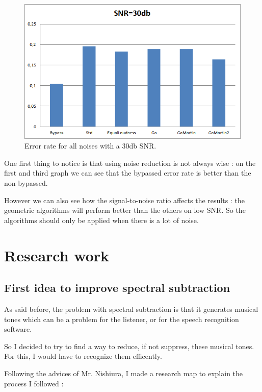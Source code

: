 \begin{figure}[H]
\begin{center}
\includegraphics[scale=0.7]{images/snr30.png}
\caption{Error rate for all noises with a 30db SNR.}
\end{center}
\end{figure}

One first thing to notice is that using noise reduction is not always wise : on the first and third graph we can see that the bypassed error rate is better than the non-bypassed. 

However we can also see how the signal-to-noise ratio affects the results : the geometric algorithms will perform better than the others on low SNR. So the algorithms should only be applied when there is a lot of noise.
\section{Research work}
\subsection{First idea to improve spectral subtraction}
As said before, the problem with spectral subtraction is that it generates musical tones which can be a problem for the listener, or for the speech recognition software.

So I decided to try to find a way to reduce, if not suppress, these musical tones.
For this, I would have to recognize them efficently.

Following the advices of Mr. Nishiura, I made a research map to explain the process I followed : 

